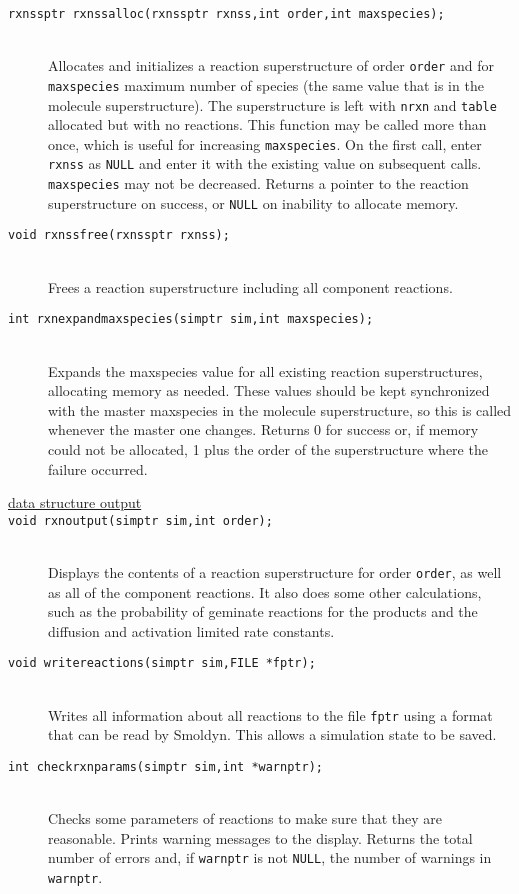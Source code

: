 \documentclass {book}
\newcommand {\ttt} {\texttt}
\begin{document}
\begin{description}
\item[\ttt{rxnssptr rxnssalloc(rxnssptr rxnss,int order,int maxspecies);}]
\hfill \\
Allocates and initializes a reaction superstructure of order \ttt{order} and for \ttt{maxspecies} maximum number of species (the same value that is in the molecule superstructure). The superstructure is left with \ttt{nrxn} and \ttt{table} allocated but with no reactions. This function may be called more than once, which is useful for increasing \ttt{maxspecies}. On the first call, enter \ttt{rxnss} as \ttt{NULL} and enter it with the existing value on subsequent calls. \ttt{maxspecies} may not be decreased. Returns a pointer to the reaction superstructure on success, or \ttt{NULL} on inability to allocate memory.

\item[\ttt{void rxnssfree(rxnssptr rxnss);}]
\hfill \\
Frees a reaction superstructure including all component reactions.

\item[\ttt{int rxnexpandmaxspecies(simptr sim,int maxspecies);}]
\hfill \\
Expands the maxspecies value for all existing reaction superstructures, allocating memory as needed. These values should be kept synchronized with the master maxspecies in the molecule superstructure, so this is called whenever the master one changes. Returns 0 for success or, if memory could not be allocated, 1 plus the order of the superstructure where the failure occurred.

\item[\underline{data structure output}]

\item[\ttt{void rxnoutput(simptr sim,int order);}]
\hfill \\
Displays the contents of a reaction superstructure for order \ttt{order}, as well as all of the component reactions. It also does some other calculations, such as the probability of geminate reactions for the products and the diffusion and activation limited rate constants.

\item[\ttt{void writereactions(simptr sim,FILE *fptr);}]
\hfill \\
Writes all information about all reactions to the file \ttt{fptr} using a format that can be read by Smoldyn. This allows a simulation state to be saved.

\item[\ttt{int checkrxnparams(simptr sim,int *warnptr);}]
\hfill \\
Checks some parameters of reactions to make sure that they are reasonable. Prints warning messages to the display. Returns the total number of errors and, if \ttt{warnptr} is not \ttt{NULL}, the number of warnings in \ttt{warnptr}.


\end{description}
\end{document}
